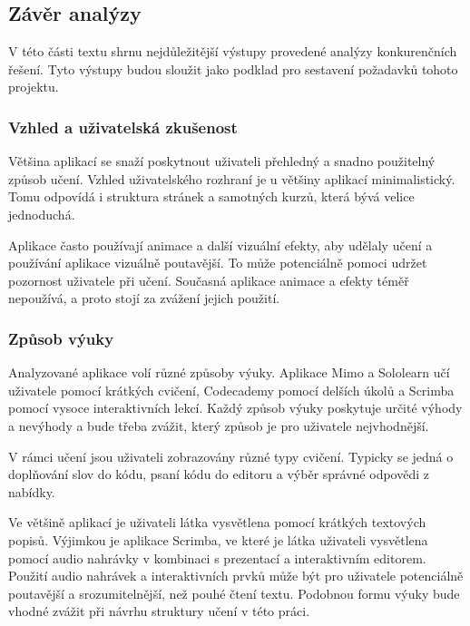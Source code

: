 \subsection{Závěr analýzy}

V této části textu shrnu nejdůležitější výstupy provedené analýzy konkurenčních řešení. Tyto výstupy budou sloužit jako podklad pro sestavení požadavků tohoto projektu.

\subsubsection{Vzhled a uživatelská zkušenost}

Většina aplikací se snaží poskytnout uživateli přehledný a snadno použitelný způsob učení. Vzhled uživatelského rozhraní je u většiny aplikací minimalistický. Tomu odpovídá i struktura stránek a samotných kurzů, která bývá velice jednoduchá.

Aplikace často používají animace a další vizuální efekty, aby udělaly učení a používání aplikace vizuálně poutavější. To může potenciálně pomoci udržet pozornost uživatele při učení. Současná aplikace animace a efekty téměř nepoužívá, a proto stojí za zvážení jejich použití.

\subsubsection{Způsob výuky}

Analyzované aplikace volí různé způsoby výuky. Aplikace Mimo a Sololearn učí uživatele pomocí krátkých cvičení, Codecademy pomocí delších úkolů a Scrimba pomocí vysoce interaktivních lekcí. Každý způsob výuky poskytuje určité výhody a nevýhody a bude třeba zvážit, který způsob je pro uživatele nejvhodnější.

V rámci učení jsou uživateli zobrazovány různé typy cvičení. Typicky se jedná o doplňování slov do kódu, psaní kódu do editoru a výběr správné odpovědi z nabídky.

Ve většině aplikací je uživateli látka vysvětlena pomocí krátkých textových popisů. Výjimkou je aplikace Scrimba, ve které je látka uživateli vysvětlena pomocí audio nahrávky v kombinaci s prezentací a interaktivním editorem. Použití audio nahrávek a interaktivních prvků může být pro uživatele potenciálně poutavější a srozumitelnější, než pouhé čtení textu. Podobnou formu výuky bude vhodné zvážit při návrhu struktury učení v této práci.

